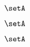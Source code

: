 {\begin{forslides}
        \begin{equation}
            \label{eq:slides-translation-167}
            \setA
        \end{equation}

        \begin{equation}
            \label{eq:slides-translation-168}
            \setA
        \end{equation}

        \begin{equation}
            \label{eq:slides-translation-169}
            \setA
        \end{equation}

    \end{forslides}

}

